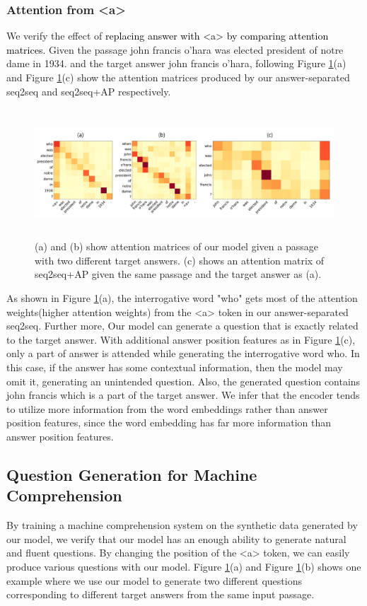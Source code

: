 \documentclass[letterpaper]{article} %
\newcommand{\hh}[1]{\textcolor{black}{#1}}
\begin{document}
\subsubsection{Attention from \textless a\textgreater{} }
We verify the effect of \hh{replacing answer with \textless a\textgreater{} by comparing attention matrices.} Given the passage  john francis o'hara was elected president of notre dame in 1934. and the target answer  john francis o'hara, following Figure \ref{fig:compare_attention}(a) and Figure \ref{fig:compare_attention}(c) show the attention matrices produced by our answer-separated seq2seq and seq2seq+AP respectively.

\begin{figure}[!htb]
\centering
\includegraphics[width =0.9 \textwidth ,height=1.89in ]{attention_compare_final.png}
\caption{(a) and (b) show attention matrices of our model given a passage with two different target answers. (c) shows an attention matrix of seq2seq+AP given the same passage and the target answer as (a).}
\label{fig:compare_attention}
\end{figure}

As shown in Figure \ref{fig:compare_attention}(a), the interrogative word "who" gets most of the attention weights(higher attention weights) from the \textless{}a\textgreater{} token in our answer-separated seq2seq. Further more, Our model can generate a question that is exactly related to the target answer. With additional answer position features as in Figure \ref{fig:compare_attention}(c), only a part of answer is attended while generating the interrogative word who. In this case, if the answer has some contextual information, then the model may omit it, generating an unintended question. Also, the generated question contains john francis which is a part of the target answer. We infer that the encoder tends to utilize more information from the word embeddings rather than answer position features, since the word embedding has far more information than answer position features.


\subsection{Question Generation for Machine Comprehension }
By training a machine comprehension system on the synthetic data generated by our model, we verify that our model has an enough ability to generate natural and fluent questions. By changing the position of the \textless a\textgreater{} token, we can easily produce various questions with our model. Figure \ref{fig:compare_attention}(a) and Figure \ref{fig:compare_attention}(b) shows one example where we use our model to generate two different questions corresponding to different target answers from the same input passage.
\end{document}
